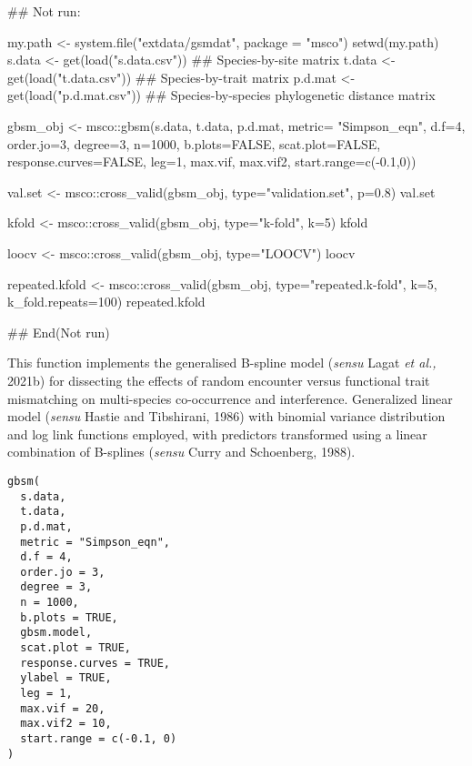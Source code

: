 \documentclass[a4paper]{book}
\begin{document}
%
\begin{Examples}
\begin{ExampleCode}
## Not run: 

my.path <- system.file("extdata/gsmdat", package = "msco")
setwd(my.path)
s.data <- get(load("s.data.csv")) ## Species-by-site matrix
t.data <- get(load("t.data.csv")) ## Species-by-trait matrix
p.d.mat <- get(load("p.d.mat.csv")) ## Species-by-species phylogenetic distance matrix

gbsm_obj <- msco::gbsm(s.data, t.data, p.d.mat, metric= "Simpson_eqn", d.f=4,
 order.jo=3, degree=3, n=1000, b.plots=FALSE, scat.plot=FALSE,
  response.curves=FALSE, leg=1, max.vif, max.vif2, start.range=c(-0.1,0))

val.set <- msco::cross_valid(gbsm_obj, type="validation.set", p=0.8)
val.set

kfold <- msco::cross_valid(gbsm_obj, type="k-fold", k=5)
kfold

loocv <- msco::cross_valid(gbsm_obj, type="LOOCV")
loocv

repeated.kfold <- msco::cross_valid(gbsm_obj, type="repeated.k-fold", k=5, k_fold.repeats=100)
repeated.kfold


## End(Not run)
\end{ExampleCode}
\end{Examples}
%
\begin{Description}\relax
This function implements the generalised B-spline model (\emph{sensu} Lagat \emph{et al.,} 2021b)
for dissecting the effects of random encounter versus functional trait mismatching on
multi-species co-occurrence and interference. Generalized linear model
(\emph{sensu} Hastie and Tibshirani, 1986) with binomial variance distribution and log link
functions employed, with predictors transformed using a linear combination of B-splines
(\emph{sensu} Curry and Schoenberg, 1988).
\end{Description}
%
\begin{Usage}
\begin{verbatim}
gbsm(
  s.data,
  t.data,
  p.d.mat,
  metric = "Simpson_eqn",
  d.f = 4,
  order.jo = 3,
  degree = 3,
  n = 1000,
  b.plots = TRUE,
  gbsm.model,
  scat.plot = TRUE,
  response.curves = TRUE,
  ylabel = TRUE,
  leg = 1,
  max.vif = 20,
  max.vif2 = 10,
  start.range = c(-0.1, 0)
)
\end{verbatim}
\end{Usage}
%
\end{document}

